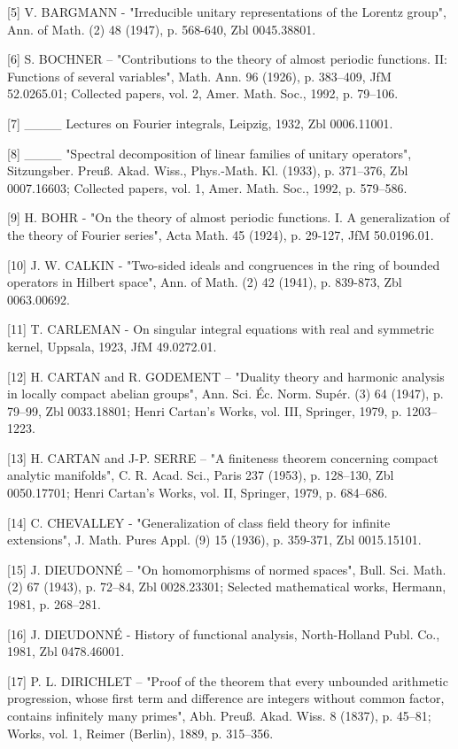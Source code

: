 {[}5{]} V. BARGMANN - "Irreducible unitary representations of the Lorentz group", Ann. of Math. (2) 48 (1947), p. 568-640, Zbl 0045.38801.

{[}6{]} S. BOCHNER -- "Contributions to the theory of almost periodic functions. II: Functions of several variables", Math. Ann. 96 (1926), p. 383--409, JfM 52.0265.01; Collected papers, vol. 2, Amer. Math. Soc., 1992, p. 79--106.

{[}7{]} \_\_\_\_ Lectures on Fourier integrals, Leipzig, 1932, Zbl 0006.11001.

{[}8{]} \_\_\_\_ "Spectral decomposition of linear families of unitary operators", Sitzungsber. Preuß. Akad. Wiss., Phys.-Math. Kl. (1933), p. 371--376, Zbl 0007.16603; Collected papers, vol. 1, Amer. Math. Soc., 1992, p. 579--586.

{[}9{]} H. BOHR - "On the theory of almost periodic functions. I. A generalization of the theory of Fourier series", Acta Math. 45 (1924), p. 29-127, JfM 50.0196.01.

{[}10{]} J. W. CALKIN - "Two-sided ideals and congruences in the ring of bounded operators in Hilbert space", Ann. of Math. (2) 42 (1941), p. 839-873, Zbl 0063.00692.

{[}11{]} T. CARLEMAN - On singular integral equations with real and symmetric kernel, Uppsala, 1923, JfM 49.0272.01.

{[}12{]} H. CARTAN and R. GODEMENT -- "Duality theory and harmonic analysis in locally compact abelian groups", Ann. Sci. Éc. Norm. Supér. (3) 64 (1947), p. 79--99, Zbl 0033.18801; Henri Cartan's Works, vol. III, Springer, 1979, p. 1203--1223.

{[}13{]} H. CARTAN and J-P. SERRE -- "A finiteness theorem concerning compact analytic manifolds", C. R. Acad. Sci., Paris 237 (1953), p. 128--130, Zbl 0050.17701; Henri Cartan's Works, vol. II, Springer, 1979, p. 684--686.

{[}14{]} C. CHEVALLEY - "Generalization of class field theory for infinite extensions", J. Math. Pures Appl. (9) 15 (1936), p. 359-371, Zbl 0015.15101.

{[}15{]} J. DIEUDONNÉ -- "On homomorphisms of normed spaces", Bull. Sci. Math. (2) 67 (1943), p. 72--84, Zbl 0028.23301; Selected mathematical works, Hermann, 1981, p. 268--281.

{[}16{]} J. DIEUDONNÉ - History of functional analysis, North-Holland Publ. Co., 1981, Zbl 0478.46001.

{[}17{]} P. L. DIRICHLET -- "Proof of the theorem that every unbounded arithmetic progression, whose first term and difference are integers without common factor, contains infinitely many primes", Abh. Preuß. Akad. Wiss. 8 (1837), p. 45--81; Works, vol. 1, Reimer (Berlin), 1889, p. 315--356.

